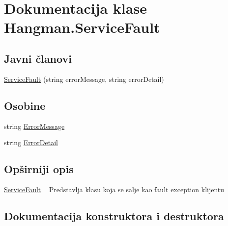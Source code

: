 \hypertarget{classHangman_1_1ServiceFault}{}\section{Dokumentacija klase Hangman.\+Service\+Fault}
\label{classHangman_1_1ServiceFault}
\subsection*{Javni članovi}
\begin{DoxyCompactItemize}
\item 
\hyperlink{classHangman_1_1ServiceFault_a4d68fdb19aef674102aa92f39176ab02}{Service\+Fault} (string error\+Message, string error\+Detail)
\end{DoxyCompactItemize}
\subsection*{Osobine}
\begin{DoxyCompactItemize}
\item 
string \hyperlink{classHangman_1_1ServiceFault_a92f02b37a1a5c038078618d37701c6f4}{Error\+Message}
\item 
string \hyperlink{classHangman_1_1ServiceFault_a97e5276c41ba1724fcb03937349952bc}{Error\+Detail}
\end{DoxyCompactItemize}


\subsection{Opširniji opis}
\hyperlink{classHangman_1_1ServiceFault}{Service\+Fault} ~\newline
 Predstavlja klasu koja se salje kao fault exception klijentu 

\subsection{Dokumentacija konstruktora i destruktora}
\hypertarget{classHangman_1_1ServiceFault_a4d68fdb19aef674102aa92f39176ab02}{}
